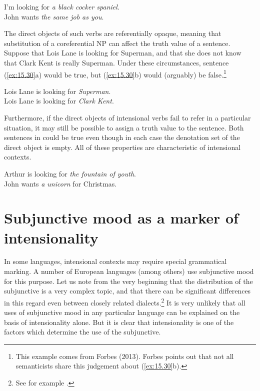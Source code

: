 \ea \label{ex:15.29}
\ea  I’m looking for \textit{a black cocker spaniel}.\\
\ex John wants \textit{the same job as you}.
                       \z
\z


The direct objects of such verbs are referentially opaque, meaning that substitution of a coreferential NP can affect the truth value of a sentence. Suppose that Lois Lane is looking for Superman, and that she does not know that Clark Kent is really Superman. Under these circumstances, sentence (\ref{ex:15.30}a) would be true, but (\ref{ex:15.30}b) would (arguably) be false.\footnote{This example comes from Forbes (2013). Forbes points out that not all semanticists share this judgement about (\ref{ex:15.30}b).}

\largerpage
\ea \label{ex:15.30}
\ea  Lois Lane is looking for \textit{Superman}.\\
\ex Lois Lane is looking for \textit{Clark Kent}.
                       \z
\z


Furthermore, if the direct objects of intensional verbs fail to refer in a particular situation, it may still be possible to assign a truth value to the sentence. Both sentences in  could be true even though in each case the denotation set of the direct object is empty. All of these properties are characteristic of intensional contexts.


\ea \label{ex:15.31}
\ea  Arthur is looking for \textit{the fountain of youth}.\\
\ex John wants \textit{a unicorn} for Christmas.
                       \z
\z

\section{Subjunctive mood as a marker of intensionality}\label{sec:15.5}

In some languages, intensional contexts may require special grammatical marking. A number of European languages (among others) use subjunctive mood for this purpose. Let us note from the very beginning that the distribution of the subjunctive is a very complex topic, and that there can be significant differences in this regard even between closely related dialects.\footnote{See for example \citet{Marques2004}.} It is very unlikely that all uses of subjunctive mood in any particular language can be explained on the basis of intensionality alone. But it is clear that intensionality is one of the factors which determine the use of the subjunctive.



